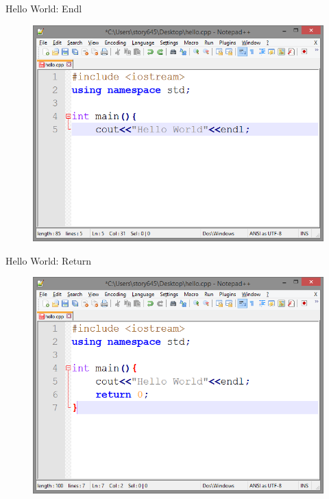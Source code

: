 \documentclass[xcolor={dvipsnames}]{beamer}
\begin{document}
\begin{frame}{Hello World: Endl}
	\begin{figure}
			\includegraphics[width=1\textwidth]{endl}
	\end{figure}
\end{frame}

\begin{frame}{Hello World: Return}
	\begin{figure}
			\includegraphics[width=1\textwidth]{return}
	\end{figure}
\end{frame}
\end{document}
